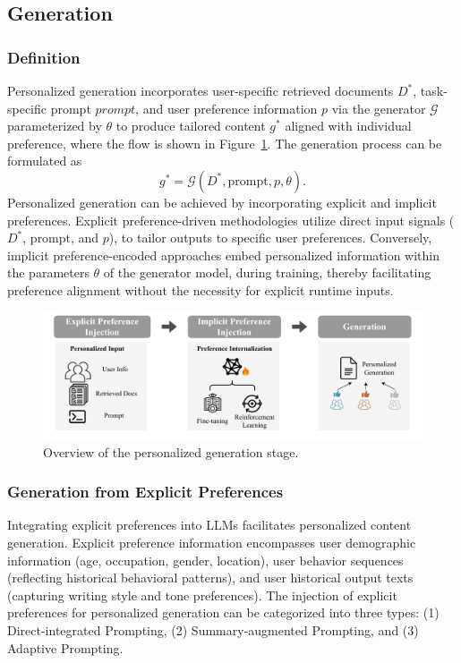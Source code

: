 \subsection{Generation}  \label{sec:Generation}
\subsubsection{\textbf{Definition}}
Personalized generation incorporates user-specific retrieved documents $D^*$, task-specific prompt $prompt$, and user preference information $p$ via the generator $\mathcal{G}$ parameterized by $\theta$ to produce tailored content $g^*$ aligned with individual preference, where the flow is shown in Figure~\ref{fig:generation}. The generation process can be formulated as
\begin{equation}
g^* = \mathcal{G} \left(D^*,\text{prompt},p,\theta \right) .
\end{equation}
Personalized generation can be achieved by incorporating explicit and implicit preferences. Explicit preference-driven methodologies utilize direct input signals (\eg $D^*$, $\text{prompt}$, and $p$), to tailor outputs to specific user preferences. Conversely, implicit preference-encoded approaches embed personalized information within the parameters $\theta$ of the generator model, during training, thereby facilitating preference alignment without the necessity for explicit runtime inputs.

\begin{figure}[t]
    \centering
    \includegraphics[width=\linewidth]{figures/generation.pdf}
    \caption{Overview of the personalized generation stage.}
    \label{fig:generation}
\end{figure}

\subsubsection{\textbf{Generation from Explicit Preferences}}
Integrating explicit preferences into LLMs facilitates personalized content generation. Explicit preference information encompasses user demographic information (\eg age, occupation, gender, location), user behavior sequences (reflecting historical behavioral patterns), and user historical output texts (capturing writing style and tone preferences). The injection of explicit preferences for personalized generation can be categorized into three types: (1) Direct-integrated Prompting, (2) Summary-augmented Prompting, and (3) Adaptive Prompting.

